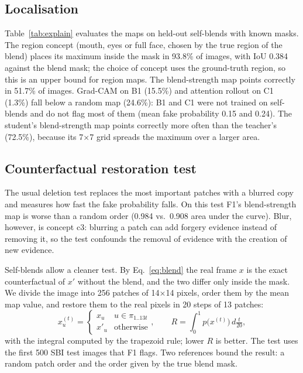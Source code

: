 \documentclass[conference]{IEEEtran}
\begin{document}


\subsection{Localisation}
Table~\ref{tab:explain} evaluates the maps on held-out self-blends with known masks. The region concept (mouth, eyes
or full face, chosen by the true region of the blend) places its maximum inside the mask in 93.8\% of images, with
IoU 0.384 against the blend mask; the choice of concept uses the ground-truth region, so this is an upper bound for
region maps. The blend-strength map points correctly in 51.7\% of images. Grad-CAM on B1 (15.5\%) and attention
rollout on C1 (1.3\%) fall below a random map (24.6\%): B1 and C1 were not trained on self-blends and do not flag
most of them (mean fake probability 0.15 and 0.24). The student's blend-strength map points correctly more often than
the teacher's (72.5\%), because its 7$\times$7 grid spreads the maximum over a larger area.

\subsection{Counterfactual restoration test}\label{sec:restore}
The usual deletion test replaces the most important patches with a blurred copy and measures how fast the fake
probability falls. On this test F1's blend-strength map is worse than a random order (0.984 vs.\ 0.908 area under
the curve). Blur, however, is concept c3: blurring a patch can add forgery evidence instead of removing it, so the
test confounds the removal of evidence with the creation of new evidence.

Self-blends allow a cleaner test. By Eq.~\eqref{eq:blend} the real frame $x$ is the exact counterfactual of $x'$
without the blend, and the two differ only inside the mask. We divide the image into 256 patches of 14$\times$14
pixels, order them by the mean map value, and restore them to the real pixels in 20 steps of 13 patches:
\begin{equation}
x^{(t)}_u = \begin{cases} x_u & u \in \pi_{1..13t} \\ x'_u & \text{otherwise}\end{cases},\qquad
R = \int_0^1 p\bigl(x^{(t)}\bigr)\,d\tfrac{t}{20},
\end{equation}
with the integral computed by the trapezoid rule; lower $R$ is better. The test uses the first 500 SBI test images
that F1 flags. Two references bound the result: a random patch order and the order given by the true blend mask.
\end{document}
